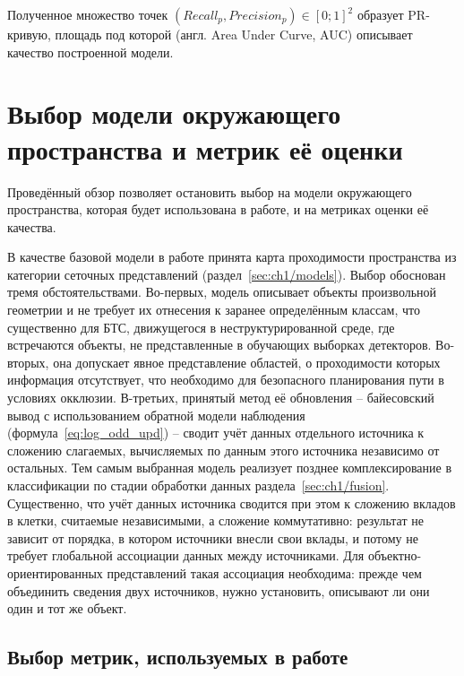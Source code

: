 Полученное множество точек $(Recall_p, Precision_p)\in\left[0;1\right]^2$ образует PR-кривую, площадь под которой (англ. Area Under Curve, AUC) описывает качество построенной модели.

\section{Выбор модели окружающего пространства и метрик её оценки}\label{sec:ch1/choice}

Проведённый обзор позволяет остановить выбор на модели окружающего пространства, которая будет использована в работе, и на метриках оценки её качества.

В качестве базовой модели в работе принята карта проходимости пространства из категории сеточных представлений (раздел~\cref{sec:ch1/models}). Выбор обоснован тремя обстоятельствами. Во-первых, модель описывает объекты произвольной геометрии и не требует их отнесения к заранее определённым классам, что существенно для БТС, движущегося в неструктурированной среде, где встречаются объекты, не представленные в обучающих выборках детекторов. Во-вторых, она допускает явное представление областей, о проходимости которых информация отсутствует, что необходимо для безопасного планирования пути в условиях окклюзии. В-третьих, принятый метод её обновления -- байесовский вывод с использованием обратной модели наблюдения (формула~\cref{eq:log_odd_upd}) -- сводит учёт данных отдельного источника к сложению слагаемых, вычисляемых по данным этого источника независимо от остальных. Тем самым выбранная модель реализует позднее комплексирование в классификации по стадии обработки данных раздела~\cref{sec:ch1/fusion}. Существенно, что учёт данных источника сводится при этом к сложению вкладов в клетки, считаемые независимыми, а сложение коммутативно: результат не зависит от порядка, в котором источники внесли свои вклады, и потому не требует глобальной ассоциации данных между источниками. Для объектно-ориентированных представлений такая ассоциация необходима: прежде чем объединить сведения двух источников, нужно установить, описывают ли они один и тот же объект.

\subsection{Выбор метрик, используемых в работе}

